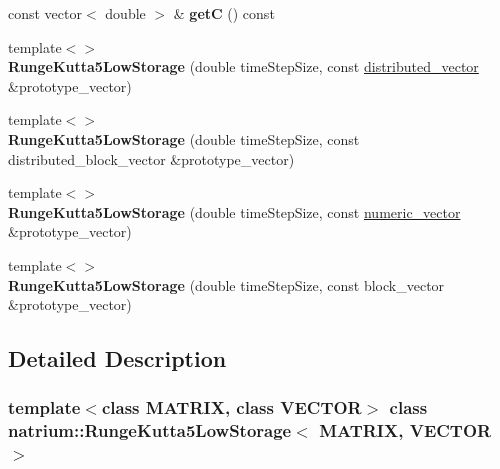 \begin{DoxyCompactItemize}
\item 
\hypertarget{classnatrium_1_1RungeKutta5LowStorage_a0b747cec432de72544b82b5033eb8211}{
const vector$<$ double $>$ \& {\bfseries getC} () const }
\label{classnatrium_1_1RungeKutta5LowStorage_a0b747cec432de72544b82b5033eb8211}

\item 
\hypertarget{classnatrium_1_1RungeKutta5LowStorage_a226065b21bd5f8e3ae7566ba53e33d1e}{
{\footnotesize template$<$$>$ }\\{\bfseries RungeKutta5LowStorage} (double timeStepSize, const \hyperlink{namespacenatrium_a903d2b92917f582f2ff05f52160ab811}{distributed\_\-vector} \&prototype\_\-vector)}
\label{classnatrium_1_1RungeKutta5LowStorage_a226065b21bd5f8e3ae7566ba53e33d1e}

\item 
\hypertarget{classnatrium_1_1RungeKutta5LowStorage_ae5c62f8f59075a950ff25719e79d6fab}{
{\footnotesize template$<$$>$ }\\{\bfseries RungeKutta5LowStorage} (double timeStepSize, const distributed\_\-block\_\-vector \&prototype\_\-vector)}
\label{classnatrium_1_1RungeKutta5LowStorage_ae5c62f8f59075a950ff25719e79d6fab}

\item 
\hypertarget{classnatrium_1_1RungeKutta5LowStorage_a54a371cac7acd4b1ab73ddf7636fb60a}{
{\footnotesize template$<$$>$ }\\{\bfseries RungeKutta5LowStorage} (double timeStepSize, const \hyperlink{namespacenatrium_a67c39077adc6634f8fa3762b8eef24c4}{numeric\_\-vector} \&prototype\_\-vector)}
\label{classnatrium_1_1RungeKutta5LowStorage_a54a371cac7acd4b1ab73ddf7636fb60a}

\item 
\hypertarget{classnatrium_1_1RungeKutta5LowStorage_a5ab769a4a099dd65cb5c2ff9d13c7eab}{
{\footnotesize template$<$$>$ }\\{\bfseries RungeKutta5LowStorage} (double timeStepSize, const block\_\-vector \&prototype\_\-vector)}
\label{classnatrium_1_1RungeKutta5LowStorage_a5ab769a4a099dd65cb5c2ff9d13c7eab}

\end{DoxyCompactItemize}


\subsection{Detailed Description}
\subsubsection*{template$<$class MATRIX, class VECTOR$>$ class natrium::RungeKutta5LowStorage$<$ MATRIX, VECTOR $>$}

